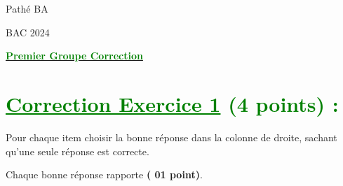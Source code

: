 \documentclass[12pt]{article}
\begin{document}
\begin{minipage}{0.8\textwidth}
	Pathé BA                          
\end{minipage}
\begin{minipage}{0.8\textwidth}
	BAC 2024
\end{minipage}

\begin{center}
\textbf{{\underline{\textcolor{green}{Premier Groupe Correction}}}}
\end{center}
\section*{\textcolor{green}{\underline{Correction Exercice 1} (4 points) :}}
Pour chaque item choisir la bonne réponse dans la colonne de droite, sachant qu'une seule réponse est correcte.

Chaque bonne réponse rapporte \textbf{( 01 point)}.
\end{document}
